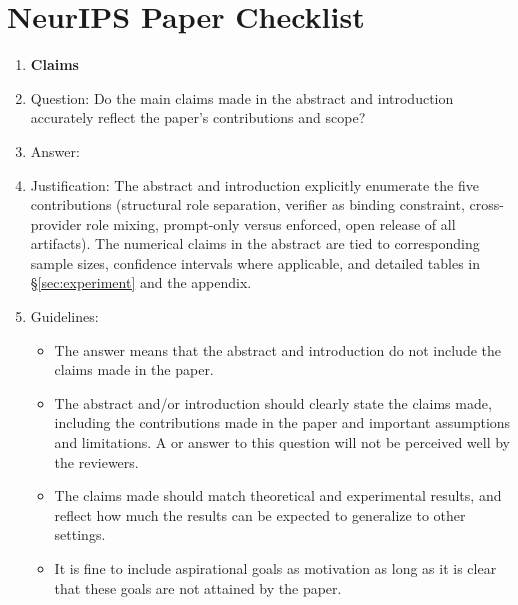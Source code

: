 \section*{NeurIPS Paper Checklist}

\begin{enumerate}

\item {\bf Claims}
    \item[] Question: Do the main claims made in the abstract and introduction accurately reflect the paper's contributions and scope?
    \item[] Answer: \answerYes{}
    \item[] Justification: The abstract and introduction explicitly enumerate the five contributions (structural role separation, verifier as binding constraint, cross-provider role mixing, prompt-only versus enforced, open release of all artifacts). 
    The numerical claims in the abstract are tied to corresponding sample sizes, confidence intervals where applicable, and detailed tables in \S\ref{sec:experiment} and the appendix.
    \item[] Guidelines:
    \begin{itemize}
        \item The answer \answerNA{} means that the abstract and introduction do not include the claims made in the paper.
        \item The abstract and/or introduction should clearly state the claims made, including the contributions made in the paper and important assumptions and limitations. A \answerNo{} or \answerNA{} answer to this question will not be perceived well by the reviewers. 
        \item The claims made should match theoretical and experimental results, and reflect how much the results can be expected to generalize to other settings. 
        \item It is fine to include aspirational goals as motivation as long as it is clear that these goals are not attained by the paper. 
    \end{itemize}


\end{enumerate}
